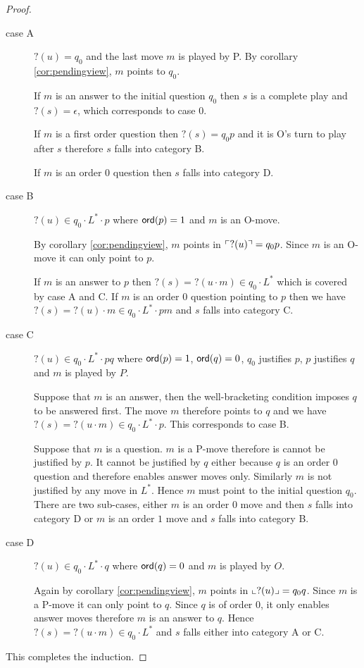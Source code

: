 \begin{proof}
\begin{description}
\item[case A] $?(u) = q_0$ and the last move $m$ is played by P.
    By corollary \ref{cor:pendingview}, $m$ points to $q_0$.

    If $m$ is an answer to the initial question $q_0$ then
    $s$ is a complete play and $?(s) = \epsilon$, which corresponds to case 0.

    If $m$ is a first order question then $?(s)= q_0 p$ and it is O's turn to play after $s$ therefore $s$ falls into category B.

    If $m$ is an order 0 question then $s$ falls into category D.

\item[case B] $?(u) \in q_0 \cdot L^* \cdot p$ where ${\sf ord}(p) = 1$ and $m$ is an O-move.

By corollary \ref{cor:pendingview}, $m$ points in $\ulcorner ?(u) \urcorner = q_0 p$. Since $m$ is an O-move it can only point to $p$.

If $m$ is an answer to $p$ then $?(s) = ?(u \cdot m) \in q_0 \cdot L^*$ which is covered by case A and C.
If $m$ is an order 0 question pointing to $p$ then we have $?(s) = ?(u) \cdot m \in q_0 \cdot L^* \cdot p m$ and $s$ falls into category C.


\item[case C] $?(u) \in q_0 \cdot L^* \cdot p q$ where ${\sf ord}(p) = 1$, ${\sf ord}(q) = 0$, $q_0$ justifies $p$, $p$ justifies $q$
                 and $m$ is played by $P$.

Suppose that $m$ is an answer, then the well-bracketing condition imposes
$q$ to be answered first. The move $m$ therefore points to $q$ and we have $?(s) = ?(u \cdot m) \in  q_0 \cdot L^* \cdot p$. This corresponds to case B.

Suppose that $m$ is a question. $m$ is a P-move therefore is cannot be justified by $p$.
It cannot be justified by $q$ either because $q$ is an order $0$ question and therefore enables answer moves only.
Similarly $m$ is not justified by any move in $L^*$.
Hence $m$ must point to the initial question $q_0$.
There are two sub-cases, either $m$ is an order $0$ move and then $s$ falls into category D
or $m$ is an order $1$ move and $s$ falls into category B.


\item[case D] $?(u) \in q_0 \cdot L^* \cdot q$ where ${\sf ord}(q) = 0$ and $m$ is played by $O$.

Again by corollary \ref{cor:pendingview}, $m$ points in $\llcorner ?(u) \lrcorner = q_0 q$. Since $m$ is a P-move it can only point to $q$.
Since $q$ is of order 0, it only enables answer moves therefore $m$ is an answer to $q$.
Hence $?(s) = ?(u\cdot m) \in q_0 \cdot L^* $ and $s$ falls either into category A or C.

\end{description}

This completes the induction.
\end{proof}


